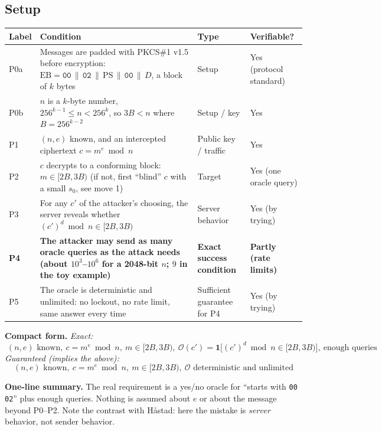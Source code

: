 \documentclass[11pt]{article}
\begin{document}
\subsection*{Setup}
\begin{center}
\begin{tabular}{@{}>{\raggedright\arraybackslash}p{1.1cm}>{\raggedright\arraybackslash}p{7.9cm}>{\raggedright\arraybackslash}p{3.4cm}>{\raggedright\arraybackslash}p{2.6cm}@{}}
\toprule
\textbf{Label} & \textbf{Condition} & \textbf{Type} & \textbf{Verifiable?} \\
\midrule
P0a & Messages are padded with PKCS\#1 v1.5 before encryption: $\text{EB}=\texttt{00}\,\|\,\texttt{02}\,\|\,\text{PS}\,\|\,\texttt{00}\,\|\,D$, a block of $k$ bytes & Setup & Yes (protocol standard) \\
P0b & $n$ is a $k$-byte number, $256^{k-1}\le n<256^{k}$, so $3B<n$ where $B=256^{k-2}$ & Setup / key & Yes \\
P1 & $(n,e)$ known, and an intercepted ciphertext $c=m^e\bmod n$ & Public key / traffic & Yes \\
P2 & $c$ decrypts to a conforming block: $m\in[2B,3B)$ (if not, first ``blind'' $c$ with a small $s_0$, see move 1) & Target & Yes (one oracle query) \\
P3 & For any $c'$ of the attacker's choosing, the server reveals whether $(c')^d\bmod n\in[2B,3B)$ & Server behavior & Yes (by trying) \\
\textbf{P4} & \textbf{The attacker may send as many oracle queries as the attack needs (about $10^3$--$10^6$ for a 2048-bit $n$; $9$ in the toy example)} & \textbf{Exact success condition} & \textbf{Partly (rate limits)} \\
P5 & The oracle is deterministic and unlimited: no lockout, no rate limit, same answer every time & Sufficient guarantee for P4 & Yes (by trying) \\
\bottomrule
\end{tabular}
\end{center}

\textbf{Compact form.}
\emph{Exact:}
\[
\boxed{\;(n,e)\text{ known},\ c=m^e\bmod n,\ m\in[2B,3B),\ \mathcal O(c')=\mathbf 1\bigl[(c')^d\bmod n\in[2B,3B)\bigr],\ \text{enough queries}\;}
\]
\emph{Guaranteed (implies the above):}
\[
\boxed{\;(n,e)\text{ known},\ c=m^e\bmod n,\ m\in[2B,3B),\ \mathcal O\text{ deterministic and unlimited}\;}
\]

\textbf{One-line summary.} The real requirement is a yes/no oracle for ``starts with \texttt{00 02}'' plus enough queries. Nothing is assumed about $e$ or about the message beyond P0--P2. Note the contrast with Håstad: here the mistake is \emph{server} behavior, not sender behavior.
\end{document}
